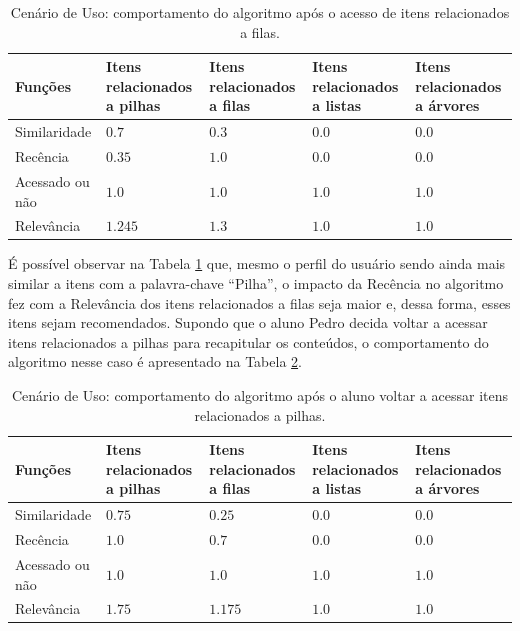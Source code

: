 \begin{table}[h]
\footnotesize
\caption[Cenário de Uso: comportamento do algoritmo após o acesso de itens relacionados a filas.]{Cenário de Uso: comportamento do algoritmo após o acesso de itens relacionados a filas.}
\label{tab:cenario-de-uso-2}
\centering
\begin{tabular}{|p{2cm}|p{2.5cm}|p{2.5cm}|p{2.5cm}|p{2.5cm}|}
  \hline
  \textbf{Funções} & \textbf{Itens relacionados a pilhas} & \textbf{Itens relacionados a filas} & \textbf{Itens relacionados a listas} & \textbf{Itens relacionados a árvores} \\
  \hline
  Similaridade & $0.7$ & $0.3$ & $0.0$ & $0.0$ \\
  \hline
  Recência & $0.35$ & $1.0$ & $0.0$ & $0.0$ \\
  \hline
  Acessado ou não & $1.0$ & $1.0$ & $1.0$ & $1.0$ \\
  \hline
  Relevância & $1.245$ & $1.3$ & $1.0$ & $1.0$ \\
  \hline
\end{tabular}
\end{table}

É possível observar na Tabela \ref{tab:cenario-de-uso-2} que, mesmo o perfil do usuário sendo ainda mais similar a itens
com a palavra-chave ``Pilha'', o impacto da Recência no algoritmo fez com a Relevância dos itens relacionados a filas
seja maior e, dessa forma, esses itens sejam recomendados. Supondo que o aluno Pedro decida voltar a acessar itens
relacionados a pilhas para recapitular os conteúdos, o comportamento do algoritmo nesse caso é apresentado na Tabela
\ref{tab:cenario-de-uso-3}.

\begin{table}[h]
\footnotesize
\caption[Cenário de Uso: comportamento do algoritmo após o aluno voltar a acessar itens relacionados a pilhas.]{Cenário de Uso: comportamento do algoritmo após o aluno voltar a acessar itens relacionados a pilhas.}
\label{tab:cenario-de-uso-3}
\centering
\begin{tabular}{|p{2cm}|p{2.5cm}|p{2.5cm}|p{2.5cm}|p{2.5cm}|}
  \hline
  \textbf{Funções} & \textbf{Itens relacionados a pilhas} & \textbf{Itens relacionados a filas} & \textbf{Itens relacionados a listas} & \textbf{Itens relacionados a árvores} \\
  \hline
  Similaridade & $0.75$ & $0.25$ & $0.0$ & $0.0$ \\
  \hline
  Recência & $1.0$ & $0.7$ & $0.0$ & $0.0$ \\
  \hline
  Acessado ou não & $1.0$ & $1.0$ & $1.0$ & $1.0$ \\
  \hline
  Relevância & $1.75$ & $1.175$ & $1.0$ & $1.0$ \\
  \hline
\end{tabular}
\end{table}

